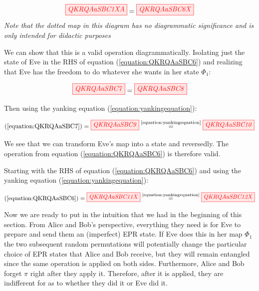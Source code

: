 \documentclass[]{article}
\newcommand{\equaltext}[1]{\ensuremath{\stackrel{\text{#1}}{=}}}
\begin{document}
\begin{equation}
\label{equation:QKRQAaSBC6}
\tikzfig{QKRQAaSBC1XA} = \tikzfig{QKRQAaSBC6X}
\end{equation}
\textit{Note that the dotted map in this diagram has no diagrammatic significance and is only intended for didactic purposes}

We can show that this is a valid operation diagrammatically. Isolating just the state of Eve in the RHS of equation (\ref{equation:QKRQAaSBC6}) and realizing that Eve has the freedom to do whatever she wants in her state $\Phi_1$:

\begin{equation}
\label{equation:QKRQAaSBC7}
\tikzfig{QKRQAaSBC7} = \tikzfig{QKRQAaSBC8}
\end{equation}

Then using the yanking equation (\ref{equation:yankingequation}):

\begin{equation}
\label{equation:QKRQAaSBC9}
(\ref{equation:QKRQAaSBC7}) = \tikzfig{QKRQAaSBC9} \equaltext{\ref{equation:yankingequation}} \tikzfig{QKRQAaSBC10}
\end{equation}

We see that we can transform Eve's map into a state and reversedly. The operation from equation (\ref{equation:QKRQAaSBC6}) is therefore valid.

Starting with the RHS of equation (\ref{equation:QKRQAaSBC6}) and using the yanking equation (\ref{equation:yankingequation}):

\begin{equation}
\begin{aligned}
\label{equation:QKRQAaSBC11}
 (\ref{equation:QKRQAaSBC6}) = \tikzfig{QKRQAaSBC11X} \equaltext{\ref{equation:yankingequation}} \tikzfig{QKRQAaSBC12X}
\end{aligned}
\end{equation}

Now we are ready to put in the intuition that we had in the beginning of this section. From Alice and Bob's perspective, everything they need is for Eve to prepare and send them an (imperfect) EPR state. If Eve does this in her map $\Phi_1$ the two subsequent random permutations will potentially change the particular choice of EPR states that Alice and Bob receive, but they will remain entangled since the same operation is applied on both sides. Furthermore, Alice and Bob forget $\pi$ right after they apply it. Therefore, after it is applied, they are indifferent for as to whether they did it or Eve did it.
\end{document}
